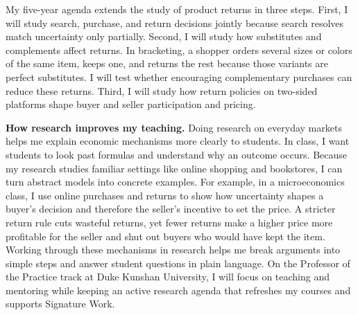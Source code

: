 \documentclass[11pt]{article}
\begin{document}
My five-year agenda extends the study of product returns in three steps. First, I will study search, purchase, and return decisions jointly because search resolves match uncertainty only partially. Second, I will study how substitutes and complements affect returns. In bracketing, a shopper orders several sizes or colors of the same item, keeps one, and returns the rest because those variants are perfect substitutes. I will test whether encouraging complementary purchases can reduce these returns. Third, I will study how return policies on two-sided platforms shape buyer and seller participation and pricing.

\noindent\textbf{How research improves my teaching.} Doing research on everyday markets helps me explain economic mechanisms more clearly to students. In class, I want students to look past formulas and understand why an outcome occurs. Because my research studies familiar settings like online shopping and bookstores, I can turn abstract models into concrete examples. For example, in a microeconomics class, I use online purchases and returns to show how uncertainty shapes a buyer's decision and therefore the seller's incentive to set the price. A stricter return rule cuts wasteful returns, yet fewer returns make a higher price more profitable for the seller and shut out buyers who would have kept the item. Working through these mechanisms in research helps me break arguments into simple steps and answer student questions in plain language. On the Professor of the Practice track at Duke Kunshan University, I will focus on teaching and mentoring while keeping an active research agenda that refreshes my courses and supports Signature Work.
\end{document}
